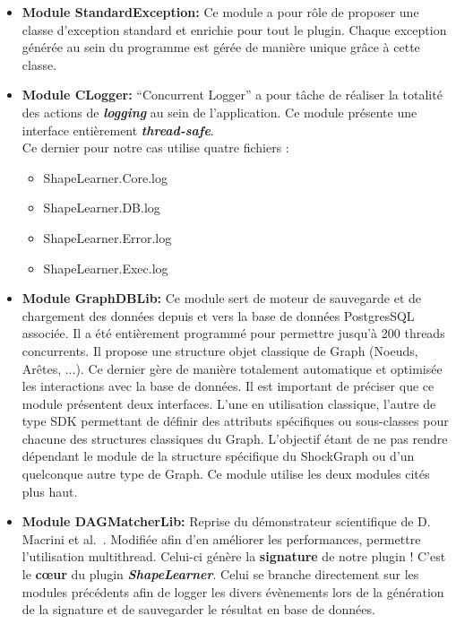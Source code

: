 \begin{itemize}	
	\item \textbf{Module StandardException: } Ce module a pour rôle de proposer une classe d'exception standard et enrichie pour tout le plugin. Chaque exception générée au sein du programme est gérée de manière unique grâce à cette classe.\\

	\item \textbf{Module CLogger: }``Concurrent Logger'' a pour tâche de réaliser la totalité des actions de \textbf{\textit{logging}} au sein de l'application. Ce module présente une interface entièrement \textbf{\textit{thread-safe}}.\\
	Ce dernier pour notre cas utilise quatre fichiers :
	\begin{itemize}
		\item ShapeLearner.Core.log
		\item ShapeLearner.DB.log
		\item ShapeLearner.Error.log
		\item ShapeLearner.Exec.log
	\end{itemize}
	\vspace{3mm}
	
	 \item \textbf{Module GraphDBLib: }Ce module sert de moteur de sauvegarde et de chargement des données depuis et vers la base de données PostgresSQL associée. Il a été entièrement programmé pour permettre jusqu'à 200 threads concurrents. Il propose une structure objet classique de Graph (Noeuds, Arêtes, ...). Ce dernier gère de manière totalement automatique et optimisée les interactions avec la base de données. Il est important de préciser que ce module présentent deux interfaces. L'une en utilisation classique, l'autre de type SDK permettant de définir des attributs spécifiques ou sous-classes pour chacune des structures classiques du Graph. L'objectif étant de ne pas rendre dépendant le module de la structure spécifique du ShockGraph ou d'un quelconque autre type de Graph. Ce module utilise les deux modules cités plus haut.\\
	 
	 \item \textbf{Module DAGMatcherLib: } Reprise du démonstrateur scientifique de D. Macrini et al.~\cite{Macrini2002}. Modifiée afin d'en améliorer les performances, permettre l'utilisation multithread. Celui-ci génère la \textbf{signature} de notre plugin ! C'est le \textbf{cœur} du plugin \textbf{\textit{ShapeLearner}}. Celui se branche directement sur les modules précédents afin de logger les divers évènements lors de la génération de la signature et de sauvegarder le résultat en base de données.\\
	 

\end{itemize}
